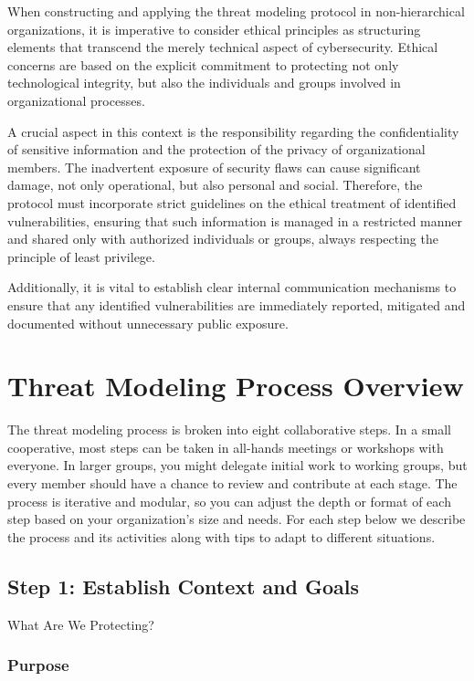 When constructing and applying the threat modeling protocol in non-hierarchical
organizations, it is imperative to consider ethical principles as structuring
elements that transcend the merely technical aspect of cybersecurity. Ethical
concerns are based on the explicit commitment to protecting not only
technological integrity, but also the individuals and groups involved in
organizational processes.

A crucial aspect in this context is the responsibility regarding the
confidentiality of sensitive information and the protection of the privacy of
organizational members. The inadvertent exposure of security flaws can cause
significant damage, not only operational, but also personal and social.
Therefore, the protocol must incorporate strict guidelines on the ethical
treatment of identified vulnerabilities, ensuring that such information is
managed in a restricted manner and shared only with authorized individuals or
groups, always respecting the principle of least privilege.

Additionally, it is vital to establish clear internal communication mechanisms
to ensure that any identified vulnerabilities are immediately reported,
mitigated and documented without unnecessary public exposure.

\section{Threat Modeling Process Overview}
\label{sec:threat_modeling_process_overview}

The threat modeling process is broken into eight collaborative steps. In a small
cooperative, most steps can be taken in all-hands meetings or workshops with
everyone. In larger groups, you might delegate initial work to
working groups, but every member should have a chance to review and contribute
at each stage. The process is iterative and modular, so you can adjust the depth
or format of each step based on your organization's size and needs. For each
step below we describe the process and its activities
along with tips to adapt to different situations.

\subsection{Step 1: Establish Context and Goals}
\label{subsec:Step1}

What Are We Protecting?

\subsubsection{Purpose}

